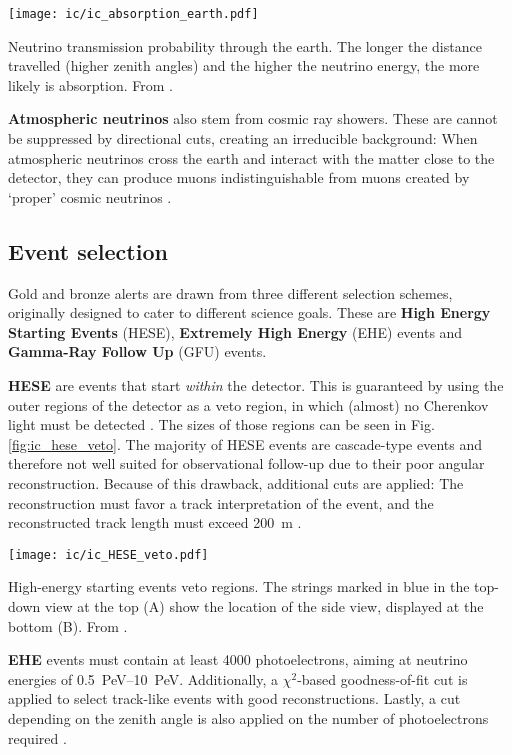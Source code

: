 \begin{marginfigure}
    \texttt{[image: ic/ic\_absorption\_earth.pdf]}
    \caption[Neutrino absorption in the earth]{Neutrino transmission probability through the earth. The longer the distance travelled (higher zenith angles) and the higher the neutrino energy, the more likely is absorption. From \cite{Aartsen2017c}.}
\end{marginfigure}

\textbf{Atmospheric neutrinos} also stem from cosmic ray showers. These are cannot be suppressed by directional cuts, creating an irreducible background: When atmospheric neutrinos cross the earth and interact with the matter close to the detector, they can produce muons indistinguishable from muons created by `proper' cosmic neutrinos \cite{Ahlers2018a}.

\subsection{Event selection} \label{ic_event_selection}
Gold and bronze alerts are drawn from three different selection schemes, originally designed to cater to different science goals. These are \textbf{High Energy Starting Events} (HESE), \textbf{Extremely High Energy} (EHE) events and \textbf{Gamma-Ray Follow Up} (GFU) events.

\textbf{HESE} are events that start \textit{within} the detector. This is guaranteed by using the outer regions of the detector as a veto region, in which (almost) no Cherenkov light must be detected . The sizes of those regions can be seen in Fig. \ref{fig:ic_hese_veto}. The majority of HESE events are cascade-type events and therefore not well suited for observational follow-up due to their poor angular reconstruction. Because of this drawback, additional cuts are applied: The reconstruction must favor a track interpretation of the event, and the reconstructed track length must exceed \SI{200}{\meter} \cite{Tung2019}.
\begin{marginfigure}
    \texttt{[image: ic/ic\_HESE\_veto.pdf]}
    \caption[HESE veto regions]{High-energy starting events veto regions. The strings marked in blue in the top-down view at the top (A) show the location of the side view, displayed at the bottom (B). From \cite{Aartsen2013}.}
\end{marginfigure}

\textbf{EHE} events must contain at least 4000 photoelectrons, aiming at neutrino energies of \SIrange{0.5}{10}{\peta\eV}. Additionally, a $\chi^2$-based goodness-of-fit cut is applied to select track-like events with good reconstructions. Lastly, a cut depending on the zenith angle is also applied on the number of photoelectrons required \cite{Tung2019}.

